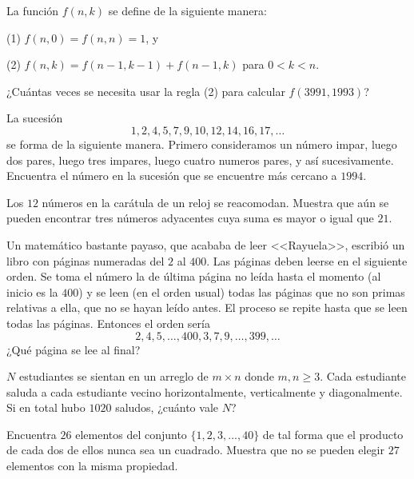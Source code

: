 \begin{problema}
La función $f(n,k)$ se define de la siguiente manera:

(1) $f(n,0) = f(n,n) = 1$, y

(2) $f(n,k) = f(n-1,k-1) + f(n-1,k)$ para $0 < k < n$.

¿Cuántas veces se necesita usar la regla (2) para calcular $f(3991,1993)$?
\end{problema}


\begin{problema}
La sucesión $$1, 2, 4, 5, 7, 9 ,10, 12, 14, 16, 17,\dots $$ se forma de la siguiente manera. Primero consideramos un número impar, luego dos pares, luego tres impares, luego cuatro numeros pares, y así sucesivamente. Encuentra el número en la sucesión que se encuentre más cercano a $1994$.
\end{problema}
\vspace{2cm}

\begin{problema}
Los $12$ números en la carátula de un reloj se reacomodan. Muestra que aún se pueden encontrar tres números adyacentes cuya suma es mayor o igual que $21$.
\end{problema}

\begin{problema}
Un matemático bastante payaso, que acababa de leer <<Rayuela>>, escribió un libro con páginas numeradas del $2$ al $400$. Las páginas deben leerse en el siguiente orden. Se toma el número la de última página no leída hasta el momento (al inicio es la $400$) y se leen (en el orden usual) todas las páginas que no son primas relativas a ella, que no se hayan leído antes. El proceso se repite hasta que se leen todas las páginas. Entonces el orden sería $$2, 4, 5,\dots , 400, 3, 7, 9,\dots , 399, \dots$$ ¿Qué página se lee al final?
\end{problema}


\begin{problema}

$N$ estudiantes se sientan en un arreglo de $m \times  n$ donde $m, n \ge  3$. Cada estudiante saluda a cada estudiante vecino horizontalmente, verticalmente y diagonalmente. Si en total hubo $1020$ saludos, ¿cuánto vale $N$?
\end{problema}


\begin{problema}

Encuentra $26$ elementos del conjunto $\{1, 2, 3, ... , 40\}$ de tal forma que el producto de cada dos de ellos nunca sea un cuadrado.
Muestra que no se pueden elegir $27$ elementos con la misma propiedad.
\end{problema}




